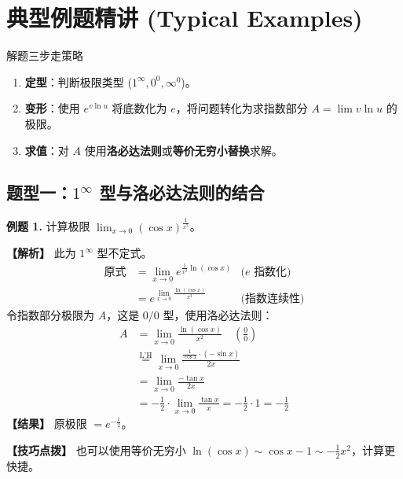 \documentclass[12pt, a4paper]{article}
\begin{document}
\newpage

\section{典型例题精讲 (Typical Examples)}

\begin{conceptbox}{解题三步走策略}
\begin{enumerate}
    \item \textbf{定型}：判断极限类型 ($1^\infty, 0^0, \infty^0$)。
    \item \textbf{变形}：使用 $e^{v \ln u}$ 将底数化为 $e$，将问题转化为求指数部分 $A = \lim v \ln u$ 的极限。
    \item \textbf{求值}：对 $A$ 使用\textbf{洛必达法则}或\textbf{等价无穷小替换}求解。
\end{enumerate}
\end{conceptbox}

\subsection*{题型一：$1^\infty$ 型与洛必达法则的结合}
\textbf{例题 1.} 计算极限 $\displaystyle \lim_{x \to 0} (\cos x)^{\frac{1}{x^2}}$。

\noindent\textbf{【解析】}
此为 $1^\infty$ 型不定式。
\begin{align*}
    \text{原式} &= \lim_{x \to 0} e^{\frac{1}{x^2} \ln(\cos x)} & \text{($e$ 指数化)} \\
    &= e^{\lim_{x \to 0} \frac{\ln(\cos x)}{x^2}} & \text{(指数连续性)}
\end{align*}
令指数部分极限为 $A$，这是 $0/0$ 型，使用洛必达法则：
\begin{align*}
    A &= \lim_{x \to 0} \frac{\ln(\cos x)}{x^2} \quad \left(\frac{0}{0}\right) \\
    &\overset{\text{L'H}}{=} \lim_{x \to 0} \frac{\frac{1}{\cos x} \cdot (-\sin x)}{2x} \\
    &= \lim_{x \to 0} \frac{-\tan x}{2x} \\
    &= -\frac{1}{2} \cdot \lim_{x \to 0} \frac{\tan x}{x} = -\frac{1}{2} \cdot 1 = -\frac{1}{2}
\end{align*}
\textbf{【结果】} 原极限 $= e^{-\frac{1}{2}}$。

\vspace{1em}
\noindent\textbf{【技巧点拨】} 也可以使用等价无穷小 $\ln(\cos x) \sim \cos x - 1 \sim -\frac{1}{2}x^2$，计算更快捷。

\vspace{1.5em}
\end{document}
